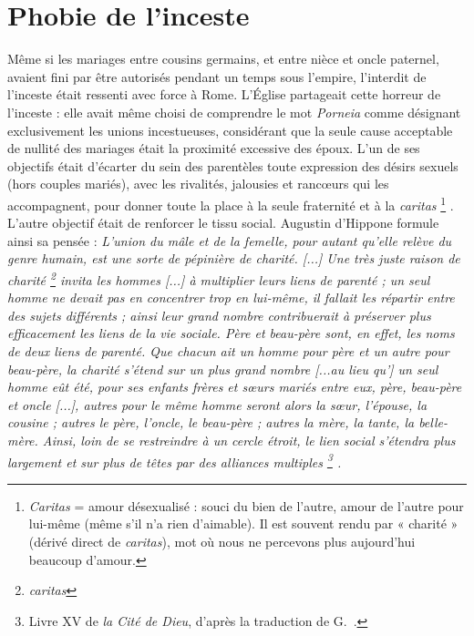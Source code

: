 \section{Phobie de l'inceste}

 Même si les mariages entre cousins germains, et entre nièce et oncle paternel, avaient fini par être autorisés pendant un temps sous l'empire, l'interdit de l'inceste était ressenti avec force à Rome. L'Église partageait cette horreur de l'inceste : elle avait même choisi de comprendre le mot \emph{Porneia} comme désignant exclusivement les unions incestueuses, considérant que la seule cause acceptable de nullité des mariages était la proximité excessive des époux. L'un de ses objectifs était d'écarter du sein des parentèles toute expression des désirs sexuels (hors couples mariés), avec les rivalités, jalousies et rancœurs qui les accompagnent, pour donner toute la place à la seule fraternité et à la \emph{caritas}%
\footnote{\emph{Caritas} = amour désexualisé : souci du bien de l'autre, amour de l'autre pour lui-même (même s'il n'a rien d'aimable). Il est souvent rendu par « charité » (dérivé direct de \emph{caritas}), mot où nous ne percevons plus aujourd'hui beaucoup d'amour.}%
. L'autre objectif était de renforcer le tissu social. Augustin d'Hippone formule ainsi sa pensée : \emph{L'union du mâle et de la femelle, pour autant qu'elle relève du genre humain, est une sorte de pépinière de charité. \emph{[...]} Une très juste raison de charité%
\footnote{\emph{caritas}}
invita les hommes \emph{[...]} à multiplier leurs liens de parenté ; un seul homme ne devait pas en concentrer trop en lui-même, il fallait les répartir entre des sujets différents ; ainsi leur grand nombre contribuerait à préserver plus efficacement les liens de la vie sociale. Père et beau-père sont, en effet, les noms de deux liens de parenté. Que chacun ait un homme pour père et un autre pour beau-père, la charité s'étend sur un plus grand nombre \emph{[...au lieu qu']} un seul homme eût été, pour ses enfants frères et sœurs mariés entre eux, père, beau-père et oncle \emph{[...]}, autres pour le même homme seront alors la sœur, l'épouse, la cousine ; autres le père, l'oncle, le beau-père ; autres la mère, la tante, la belle-mère. Ainsi, loin de se restreindre à un cercle étroit, le lien social s'étendra plus largement et sur plus de têtes par des alliances multiples%
\footnote{Livre XV de \emph{la Cité de Dieu}, d'après la traduction de G.~.}%
.}

